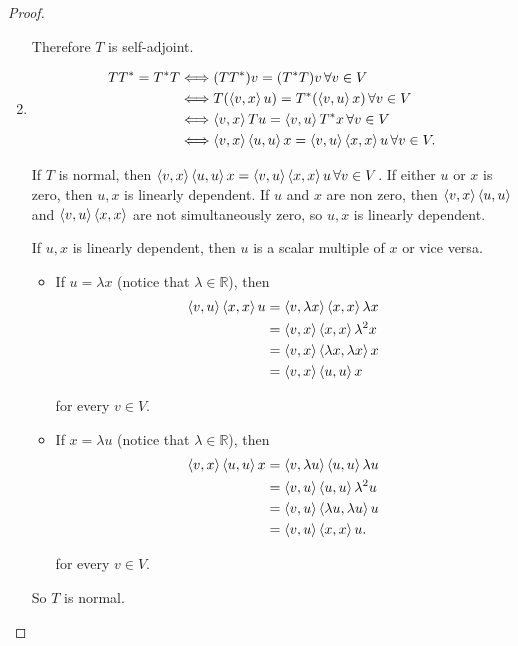\begin{proof}
\begin{enumerate}[label={(\alph*)}]
        Therefore $T$ is self-adjoint.
        \item \begin{align*}
            TT^{*} = T^{*}T & \Longleftrightarrow (TT^{*})v = (T^{*}T)v\,\forall v\in V \\
                            & \Longleftrightarrow T(\left\langle{v, x}\right\rangle u) = T^{*}(\left\langle{v, u}\right\rangle x)\,\forall v\in V \\
                            & \Longleftrightarrow \left\langle{v, x}\right\rangle Tu = \left\langle{v, u}\right\rangle T^{*}x \,\forall v\in V \\
                            & \Longleftrightarrow \left\langle{v, x}\right\rangle\left\langle{u, u}\right\rangle x = \left\langle{v, u}\right\rangle\left\langle{x, x}\right\rangle u\,\forall v\in V.
        \end{align*}

        If $T$ is normal, then $\left\langle{v, x}\right\rangle\left\langle{u, u}\right\rangle x = \left\langle{v, u}\right\rangle\left\langle{x, x}\right\rangle u\,\forall v\in V$. If either $u$ or $x$ is zero, then $u, x$ is linearly dependent. If $u$ and $x$ are non zero, then $\left\langle{v, x}\right\rangle\left\langle{u, u}\right\rangle$ and $\left\langle{v, u}\right\rangle\left\langle{x, x}\right\rangle$ are not simultaneously zero, so $u, x$ is linearly dependent.

        If $u, x$ is linearly dependent, then $u$ is a scalar multiple of $x$ or vice versa.
        \begin{itemize}
            \item If $u = \lambda x$ (notice that $\lambda\in\mathbb{R}$), then
            \begin{align*}
                \left\langle{v, u}\right\rangle\left\langle{x, x}\right\rangle u & = \left\langle{v, \lambda x}\right\rangle\left\langle{x, x}\right\rangle\lambda x \\
                & = \left\langle{v, x}\right\rangle\left\langle{x, x}\right\rangle\lambda^{2} x \\
                & = \left\langle{v, x}\right\rangle\left\langle{\lambda x, \lambda x}\right\rangle x \\
                & = \left\langle{v, x}\right\rangle\left\langle{u, u}\right\rangle x
            \end{align*}

            for every $v\in V$.
            \item If $x = \lambda u$ (notice that $\lambda\in\mathbb{R}$), then
            \begin{align*}
                \left\langle{v, x}\right\rangle\left\langle{u, u}\right\rangle x & = \left\langle{v, \lambda u}\right\rangle\left\langle{u, u}\right\rangle\lambda u \\
                & = \left\langle{v, u}\right\rangle\left\langle{u, u}\right\rangle\lambda^{2}u \\
                & = \left\langle{v, u}\right\rangle\left\langle{\lambda u, \lambda u}\right\rangle u \\
                & = \left\langle{v, u}\right\rangle\left\langle{x, x}\right\rangle u.
            \end{align*}

            for every $v\in V$.
        \end{itemize}

        So $T$ is normal.
    \end{enumerate}
\end{proof}
\newpage

